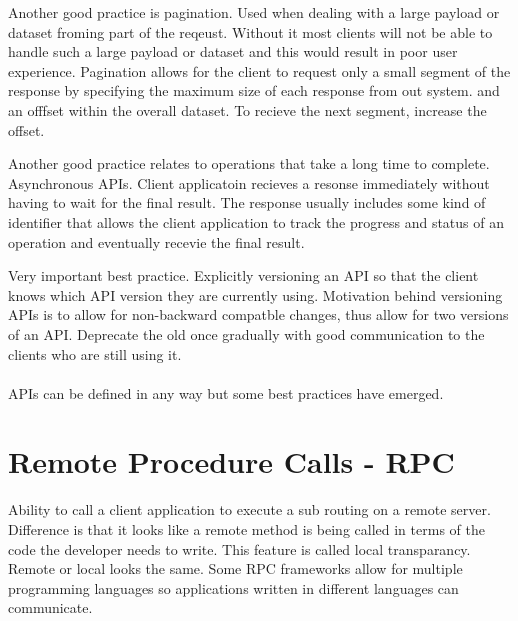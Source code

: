 \documentclass[a4paper, 11pt]{book}
\begin{document}
    Another good practice is pagination.
    Used when dealing with a large payload or dataset froming part of the reqeust.
    Without it most clients will not be able to handle such a large payload or dataset and this would result in poor user experience.
    Pagination allows for the client to request only a small segment of the response by specifying the maximum size of each response from out system.
    and an offfset within the overall dataset.
    To recieve the next segment, increase the offset.

    Another good practice relates to operations that take a long time to complete.
    Asynchronous APIs.
    Client applicatoin recieves a resonse immediately without having to wait for the final result.
    The response usually includes some kind of identifier that allows the client application to track the progress and status of an operation and eventually recevie the final result.

    Very important best practice.
    Explicitly versioning an API so that the client knows which API version they are currently using.
    Motivation behind versioning APIs is to allow for non-backward compatble changes, thus allow for two versions of an API.
    Deprecate the old once gradually with good communication to the clients who are still using it.

    \paragraph{}
    APIs can be defined in any way but some best practices have emerged.


    \section{Remote Procedure Calls - RPC}
    Ability to call a client application to execute a sub routing on a remote server.
    Difference is that it looks like a remote method is being called in terms of the code the developer needs to write.
    This feature is called local transparancy. Remote or local looks the same.
    Some RPC frameworks allow for multiple programming languages so applications written in different languages can communicate.
\end{document}
